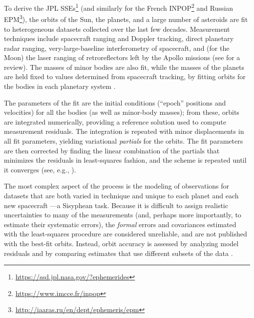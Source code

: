 \documentclass[iop,apj,twocolappendix]{emulateapj}
\begin{document}
To derive the JPL SSEs\footnote{\href{https://ssd.jpl.nasa.gov/?ephemerides}{https://ssd.jpl.nasa.gov/?ephemerides}} (and similarly for the French INPOP\footnote{\href{https://www.imcce.fr/inpop}{https://www.imcce.fr/inpop}} and Russian EPM\footnote{\href{http://iaaras.ru/en/dept/ephemeris/epm}{http://iaaras.ru/en/dept/ephemeris/epm}}),
the orbits of the Sun, the planets, and a large number of asteroids are fit to heterogeneous datasets collected over the last few decades. Measurement techniques include spacecraft ranging and Doppler tracking, direct planetary radar ranging, very-large-baseline interferometry of spacecraft, and (for the Moon) the laser ranging of retroreflectors left by the Apollo missions (see \citealt{verma2013} for a review). The masses of minor bodies are also fit, while the masses of the planets are held fixed to values determined from spacecraft tracking, by fitting orbits for the bodies in each planetary system \citep{jh+2000,2006AJ....132.2520J,2014AJ....148...76J,2009AJ....137.4322J}.

The parameters of the fit are the initial conditions (``epoch'' positions and velocities) for all the bodies (as well as minor-body masses); from these, orbits are integrated numerically, providing a reference solution used to compute measurement residuals.
The integration is repeated with minor displacements in all fit parameters, yielding variational \emph{partials} for the orbits. The fit parameters are then corrected by finding the linear combination of the partials that minimizes the residuals in least-squares fashion, and the scheme is repeated until it converges (see, e.g., \citealt{1983A&A...125..150N}).

The most complex aspect of the process is the modeling of observations for datasets that are both varied in technique and unique to each planet and each new spacecraft \citep{moyer2003}---a Sisyphean task. Because it is difficult to assign realistic uncertainties to many of the measurements (and, perhaps more importantly, to estimate their systematic errors), the \emph{formal} errors and covariances estimated with the least-squares procedure are considered unreliable, and are not published with the best-fit orbits. Instead, orbit accuracy is assessed by analyzing model residuals and by comparing estimates that use different subsets of the data \citep{de434cov,de438}.
\end{document}
